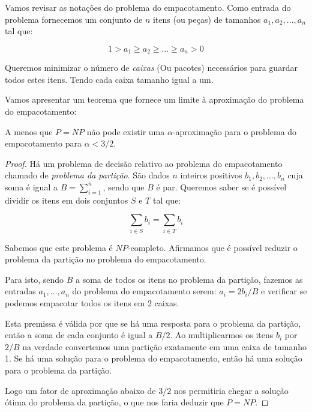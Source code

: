 Vamos revisar as notações do problema do empacotamento. Como entrada do problema fornecemos um conjunto de $n$ itens (ou peças) de tamanhos $a_1,a_2,\ldots,a_n$ tal que:

\begin{equation}
1 > a_1 \geq a_2 \geq \ldots \geq a_n > 0 
\end{equation}

Queremos minimizar o número de \textit{caixas} (Ou pacotes) necessários para guardar todos estes itens. Tendo cada caixa tamanho igual a um.

Vamos apresentar um teorema que fornece um limite à aproximação do problema do empacotamento:

\begin{teorema}
A menos que $P=NP$ não pode existir uma $\alpha$-aproximação para o problema do empacotamento para $\alpha < 3/2$.
\end{teorema}

\begin{proof}
Há um problema de decisão relativo ao problema do empacotamento chamado de \textit{problema da partição}. São dados $n$ inteiros positivos $b_1, b_2, \ldots, b_n$ cuja soma é igual a $B = \sum_{i=1}^{n}$, sendo que $B$ é par. Queremos saber se é possível dividir os itens em dois conjuntos $S$ e $T$ tal que:

\begin{equation}
\sum_{i \in S} b_i = \sum_{i \in T} b_i
\end{equation}

Sabemos que este problema é $NP$-completo. Afirmamos que é possível reduzir o problema da partição no problema do empacotamento.

Para isto, sendo $B$ a soma de todos os itens no problema da partição, fazemos as entradas $a_1, \ldots, a_n$ do problema do empacotamento serem: $a_i = 2b_i/B$ e verificar se podemos empacotar todos os itens em 2 caixas.

Esta premissa é válida por que se há uma resposta para o problema da partição, então a soma de cada conjunto é igual a $B/2$. Ao multiplicarmos os itens $b_i$ por $2/B$ na verdade convertemos uma partição exatamente em uma caixa de tamanho 1. Se há uma solução para o problema do empacotamento, então há uma solução para o problema da partição.

Logo um fator de aproximação abaixo de $3/2$ nos permitiria chegar a solução ótima do problema da partição, o que nos faria deduzir que $P=NP$.

\end{proof}

